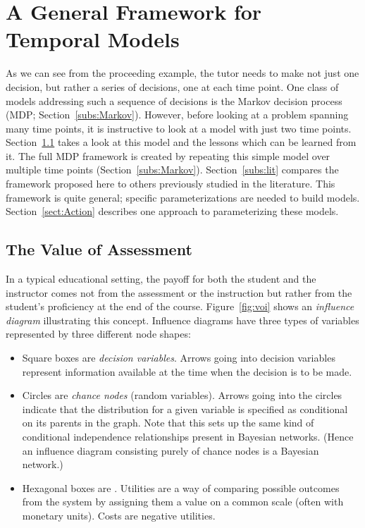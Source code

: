 \documentclass[12pt]{RR-article}
\begin{document}
\section{A General Framework for Temporal Models}
\label{sect:Framework}


As we can see from the proceeding example, the tutor needs to make not
just one decision, but rather a series of decisions, one at each time
point.  One class of models addressing such a sequence of decisions is
the Markov decision process (MDP; Section~\ref{subs:Markov}).
However, before looking at a problem spanning many time points, it is
instructive to look at a model with just two time points.
Section~\ref{subs:VOI} takes a look at this model and the lessons
which can be learned from it.  The full MDP framework is created by
repeating this simple model over multiple time points
(Section~\ref{subs:Markov}).  Section~\ref{subs:lit} compares the
framework proposed here to others previously studied in the
literature.  This framework is quite general; specific
parameterizations are needed to build
models. Section~\ref{sect:Action} describes one approach to
parameterizing these models.

\subsection{The Value of Assessment}
\label{subs:VOI}

In a typical educational setting, the payoff for both the student and
the instructor comes not from the assessment or the instruction but
rather from the student's proficiency at the end of the course.
Figure~\ref{fig:voi} shows an {\it{influence diagram}\/}
\cite{HowardMatheson1981} illustrating this concept.  Influence
diagrams have three types of variables represented by three different
node shapes:
\begin{itemize}
\item Square boxes are {\it{decision variables}\/}.  Arrows going into
decision variables represent information available at the time when
the decision is to be made.
\item Circles are \textit{chance nodes\/} ({random variables}).
  Arrows going into the circles indicate that the distribution for
  a given variable is specified as conditional on its parents in the
  graph.  Note that this sets up the same kind of conditional
  independence relationships present in Bayesian networks.
  (Hence an influence diagram consisting purely of chance nodes is a
  Bayesian network.)
\item Hexagonal boxes are {\it{}\/}.  Utilities are a
  way of comparing possible outcomes from the system by assigning them
  a value on a common scale (often with monetary units).  Costs are
  negative utilities.    
\end{itemize}
\end{document}
